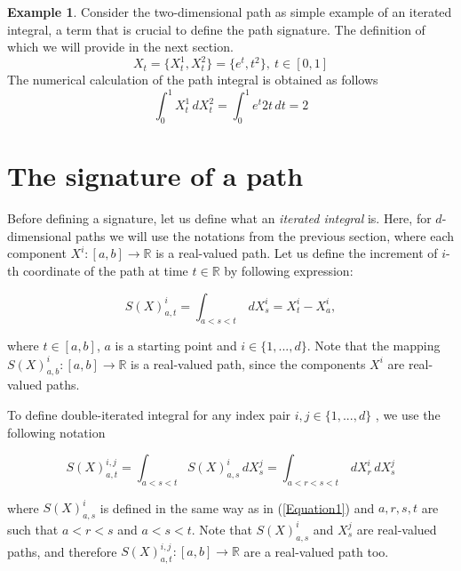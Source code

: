 \documentclass[12pt,a4paper]{report}
\theoremstyle{definition}
\newtheorem{example}{Example}
\begin{document}
\begin{example}
  Consider the two-dimensional path as simple example of an iterated integral, a term that is crucial to define the path signature. The definition of which we will provide in the next section.
 	\begin{equation} 	
  	X_t=\{X_t^1,X_t^2\}=\{e^t, t^2\}, \: t\in [0,1]
  	 \end{equation}
  The numerical calculation of the path integral is obtained as follows  
  \begin{equation}
  	\int_{0}^{1} X_t^1 \,d X_t^2=\int_{0}^{1} e^t 2t \,d t=2
  \end{equation}
  
\end{example}




\section{The signature of a path}

Before defining a signature, let us define what an \textit{iterated integral} is. Here, for $d$-dimensional paths we will use the notations from the previous section, where each component $X^{i}:[a,b]\rightarrow\mathbb{R}$ is a real-valued path. Let us define the increment of $i$-th coordinate of the path at time $t\in \mathbb{R}$ by following expression:

\begin{equation}
	S(X)_{a,t}^{i}=\int_{a<s<t}\,dX_s^{i}=X_t^{i}-X_a^{i},
	\label{Equation1}
\end{equation}

where $t\in[a,b]$, $a$ is a starting point and $i\in \{1, ...,d\}$. Note that the mapping $S(X)_{a,b}^{i}:[a,b]\rightarrow\mathbb{R}$ is a real-valued path, since the components $X^{i}$ are real-valued paths. 

To define double-iterated integral for any index pair $i,j\in \{1,..., d\}$ , we use the following notation
 
\begin{equation}
	S(X)_{a,t}^{i,j}=\int_{a<s<t}S(X)_{a,s}^{i}\,dX_s^{j}=\int_{a<r<s<t}\,dX_r^{i}\,dX_s^{j}
\end{equation}

where $S(X)_{a,s}^{i}$ is defined in the same way as in (\ref{Equation1}) and $a,r,s,t$ are such that $a<r<s$ and $a<s<t$. Note that $S(X)_{a,s}^{i}$ and $X_s^{j}$ are real-valued paths, and therefore $S(X)_{a,t}^{i,j}:[a,b]\rightarrow\mathbb{R}$ are a real-valued path too.
\end{document}
